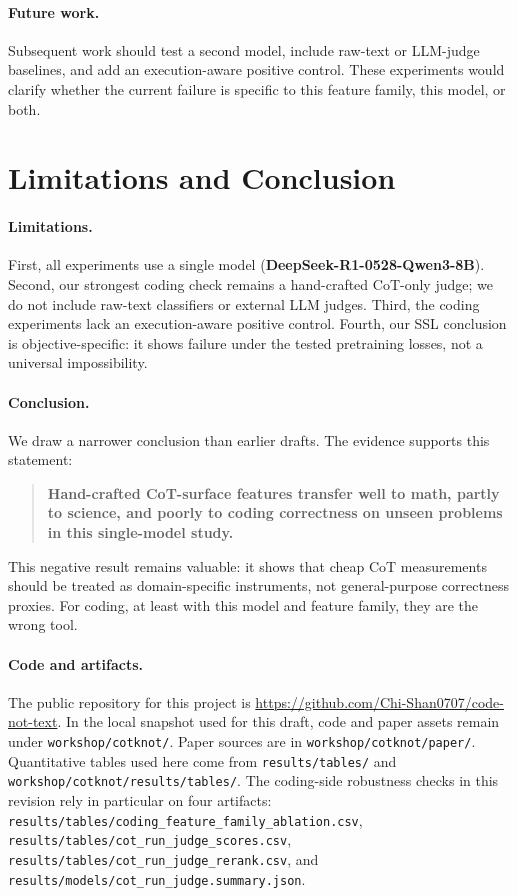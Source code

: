 \documentclass[10pt,twocolumn]{article}
\begin{document}
\paragraph{Future work.}
Subsequent work should test a second model, include raw-text or LLM-judge baselines, and add an execution-aware positive control. These experiments would clarify whether the current failure is specific to this feature family, this model, or both.

\section{Limitations and Conclusion}
\label{sec:limits}

\paragraph{Limitations.}
First, all experiments use a single model (\textbf{DeepSeek-R1-0528-Qwen3-8B}). Second, our strongest coding check remains a hand-crafted CoT-only judge; we do not include raw-text classifiers or external LLM judges. Third, the coding experiments lack an execution-aware positive control. Fourth, our SSL conclusion is objective-specific: it shows failure under the tested pretraining losses, not a universal impossibility.

\paragraph{Conclusion.}
We draw a narrower conclusion than earlier drafts. The evidence supports this statement:

\begin{quote}
\textbf{Hand-crafted CoT-surface features transfer well to math, partly to science, and poorly to coding correctness on unseen problems in this single-model study.}
\end{quote}

This negative result remains valuable: it shows that cheap CoT measurements should be treated as domain-specific instruments, not general-purpose correctness proxies. For coding, at least with this model and feature family, they are the wrong tool.

\paragraph{Code and artifacts.}
The public repository for this project is \url{https://github.com/Chi-Shan0707/code-not-text}. In the local snapshot used for this draft, code and paper assets remain under \texttt{workshop/cotknot/}. Paper sources are in \texttt{workshop/cotknot/paper/}. Quantitative tables used here come from \texttt{results/tables/} and \texttt{workshop/cotknot/results/tables/}. The coding-side robustness checks in this revision rely in particular on four artifacts: \texttt{results/tables/coding\_feature\_family\_ablation.csv}, \texttt{results/tables/cot\_run\_judge\_scores.csv}, \texttt{results/tables/cot\_run\_judge\_rerank.csv}, and \texttt{results/models/cot\_run\_judge.summary.json}.
\end{document}
